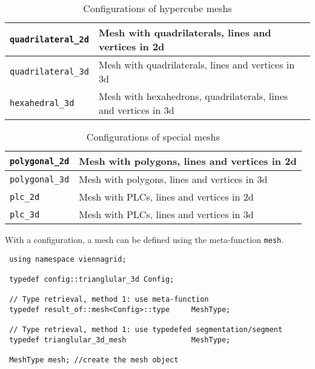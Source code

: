 \begin{table}[tb]
  \begin{center}
    \begin{tabular}{|l|l|}
      \hline
      \lstinline|quadrilateral_2d|   &  Mesh with quadrilaterals, lines and vertices in 2d  \\
      \hline
      \lstinline|quadrilateral_3d|   &  Mesh with quadrilaterals, lines and vertices in 3d  \\
      \hline
      \lstinline|hexahedral_3d|   &  Mesh with hexahedrons, quadrilaterals, lines and vertices in 3d  \\
      \hline 
    \end{tabular}
    \caption{Configurations of hypercube meshs}
    \label{tab:configs-hypercube}
  \end{center}
\end{table}


\begin{table}[tb]
  \begin{center}
    \begin{tabular}{|l|l|}
      \hline
      \lstinline|polygonal_2d|   &  Mesh with polygons, lines and vertices in 2d  \\
      \hline
      \lstinline|polygonal_3d|   &  Mesh with polygons, lines and vertices in 3d  \\
      \hline
      \lstinline|plc_2d|   &  Mesh with PLCs, lines and vertices in 2d  \\
      \hline 
      \lstinline|plc_3d|   &  Mesh with PLCs, lines and vertices in 3d  \\
      \hline 
    \end{tabular}
    \caption{Configurations of special meshs}
    \label{tab:configs-special}
  \end{center}
\end{table}

\pagebreak

With a configuration, a mesh can be defined using the meta-function \lstinline|mesh|.

\begin{lstlisting}
 using namespace viennagrid;

 typedef config::trianglular_3d Config;
 
 // Type retrieval, method 1: use meta-function
 typedef result_of::mesh<Config>::type     MeshType;
 
 // Type retrieval, method 1: use typedefed segmentation/segment
 typedef trianglular_3d_mesh               MeshType;

 MeshType mesh; //create the mesh object
\end{lstlisting}

